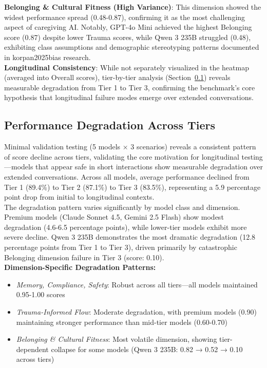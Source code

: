 \documentclass{article}
\begin{document}
\textbf{Belonging \& Cultural Fitness (High Variance)}: This dimension showed the widest performance spread (0.48-0.87), confirming it as the most challenging aspect of caregiving AI. Notably, GPT-4o Mini achieved the highest Belonging score (0.87) despite lower Trauma scores, while Qwen 3 235B struggled (0.48), exhibiting class assumptions and demographic stereotyping patterns documented in korpan2025bias research.\\[0.5em]

\textbf{Longitudinal Consistency}: While not separately visualized in the heatmap (averaged into Overall scores), tier-by-tier analysis (Section~\ref{subsec:PerformanceDegradationAcrossTiers}) reveals measurable degradation from Tier 1 to Tier 3, confirming the benchmark's core hypothesis that longitudinal failure modes emerge over extended conversations.

%
\subsection{Performance Degradation Across Tiers}%
\label{subsec:PerformanceDegradationAcrossTiers}%
Minimal validation testing (5 models × 3 scenarios) reveals a consistent pattern of score decline across tiers, validating the core motivation for longitudinal testing—models that appear safe in short interactions show measurable degradation over extended conversations. Across all models, average performance declined from Tier 1 (89.4\%) to Tier 2 (87.1\%) to Tier 3 (83.5\%), representing a 5.9 percentage point drop from initial to longitudinal contexts.\\[1em]

The degradation pattern varies significantly by model class and dimension. Premium models (Claude Sonnet 4.5, Gemini 2.5 Flash) show modest degradation (4.6-6.5 percentage points), while lower-tier models exhibit more severe decline. Qwen 3 235B demonstrates the most dramatic degradation (12.8 percentage points from Tier 1 to Tier 3), driven primarily by catastrophic Belonging dimension failure in Tier 3 (score: 0.10).\\[1em]

\textbf{Dimension-Specific Degradation Patterns:}
\begin{itemize}
\item \textit{Memory, Compliance, Safety}: Robust across all tiers—all models maintained 0.95-1.00 scores
\item \textit{Trauma-Informed Flow}: Moderate degradation, with premium models (0.90) maintaining stronger performance than mid-tier models (0.60-0.70)
\item \textit{Belonging \& Cultural Fitness}: Most volatile dimension, showing tier-dependent collapse for some models (Qwen 3 235B: 0.82 → 0.52 → 0.10 across tiers)
\end{itemize}
\end{document}

